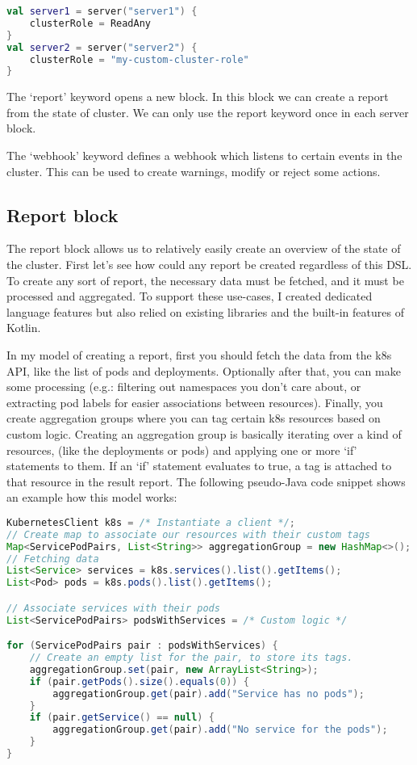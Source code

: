 \begin{lstlisting}[caption={Usage of the clusterRole keyword},language=Kotlin,label=code:clusterrole_usage]
val server1 = server("server1") {
    clusterRole = ReadAny
}
val server2 = server("server2") {
    clusterRole = "my-custom-cluster-role"
}
\end{lstlisting}


The `report' keyword opens a new block. In this block we can create a report from the state of cluster. We can only use the report keyword once in each server block.

The `webhook' keyword defines a webhook which listens to certain events in the cluster. This can be used to create warnings, modify or reject some actions.

\subsection{Report block}

The report block allows us to relatively easily create an overview of the state of the cluster. First let's see how could any report be created regardless of this DSL. To create any sort of report, the necessary data must be fetched, and it must be processed and aggregated. To support these use-cases, I created dedicated language features but also relied on existing libraries and the built-in features of Kotlin.

In my model of creating a report, first you should fetch the data from the k8s API, like the list of pods and deployments. Optionally after that, you can make some processing (e.g.: filtering out namespaces you don't care about, or extracting pod labels for easier associations between resources). Finally, you create aggregation groups where you can tag certain k8s resources based on custom logic. Creating an aggregation group is basically iterating over a kind of resources, (like the deployments or pods) and applying one or more `if' statements to them. If an `if' statement evaluates to true, a tag is attached to that resource in the result report. The following pseudo-Java code snippet shows an example how this model works:

\begin{lstlisting}[caption={Example report in pseudo-Java},language=Java,label=code:pseudo_report]
KubernetesClient k8s = /* Instantiate a client */;
// Create map to associate our resources with their custom tags
Map<ServicePodPairs, List<String>> aggregationGroup = new HashMap<>();
// Fetching data
List<Service> services = k8s.services().list().getItems();
List<Pod> pods = k8s.pods().list().getItems();

// Associate services with their pods
List<ServicePodPairs> podsWithServices = /* Custom logic */

for (ServicePodPairs pair : podsWithServices) {
    // Create an empty list for the pair, to store its tags.
    aggregationGroup.set(pair, new ArrayList<String>);
    if (pair.getPods().size().equals(0)) {
        aggregationGroup.get(pair).add("Service has no pods");
    }
    if (pair.getService() == null) {
        aggregationGroup.get(pair).add("No service for the pods");
    }
}
\end{lstlisting}

